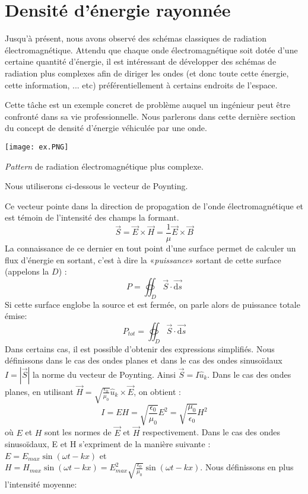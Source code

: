 \section{Densité d'énergie rayonnée}

Jusqu'à présent, nous avons observé des schémas classiques de radiation électromagnétique. Attendu que chaque onde électromagnétique soit dotée d'une certaine quantité d'énergie, il est intéressant de développer des schémas de radiation plus complexes afin de diriger les ondes (et donc toute cette énergie, cette information, ... etc) préférentiellement à certains endroits de l'espace.

Cette tâche est un exemple concret de problème auquel un ingénieur peut être confronté dans sa vie professionnelle. Nous parlerons dans cette dernière section du concept de densité d'énergie véhiculée par une onde.
\begin{marginfigure}
	\centering
\texttt{[image: ex.PNG]}
\caption{\textit{Pattern} de radiation électromagnétique plus complexe.}
\label{fig:pattern}
\end{marginfigure}

Nous utiliserons ci-dessous le vecteur de Poynting.

Ce vecteur pointe dans la direction de propagation de l'onde électromagnétique et est témoin de l'intensité des champs la formant. 
$$ \vec{S} = \vec{E}\times \vec{H} = \frac{1}{\mu} \vec{E}\times \vec{B} $$
La connaissance de ce dernier en tout point d'une surface permet de calculer un flux d'énergie en sortant, c'est à dire la «\textit{puissance}» sortant de cette surface (appelons la $D$) : 
$$ P = \oiint_{D} \vec{S}\cdot \vec{\textrm{d}s}$$
Si cette surface englobe la source et est fermée, on parle alors de puissance totale émise: 
$$P_{tot}=\oiint_D\vec{S}\cdot \vec{\textrm{d}s}$$
Dans certains cas, il est possible d'obtenir des expressions simplifiés.
Nous définissons dans le cas des ondes planes et dans le cas des ondes sinusoïdaux $I=|\vec{S}|$ la norme du vecteur de Poynting. Ainsi $\vec{S}=I \hat{u}_k$. 
Dans le cas des ondes planes, en utilisant $\vec{H}=\sqrt{\frac{\epsilon_{0}}{\mu_0}}\hat{u}_k \times \vec{E}$, on obtient : 
$$ I=EH=\sqrt{\frac{\epsilon_{0}}{\mu_0}}E^2=\sqrt{\frac{\mu_0}{\epsilon_{0}}}H^2$$
où $E$ et $H$ sont les normes de $\vec{E}$ et $\vec{H}$ respectivement.
Dans le cas des ondes sinusoïdaux, E et H s'expriment de la manière suivante : $E=E_{max}\sin(\omega t-kx)$ et $H=H_{max}\sin(\omega t-kx)=E_{max}^2\sqrt{\frac{\epsilon_0}{\mu_0}}\sin(\omega t-kx)$. Nous définissons en plus l'intensité moyenne:
 
